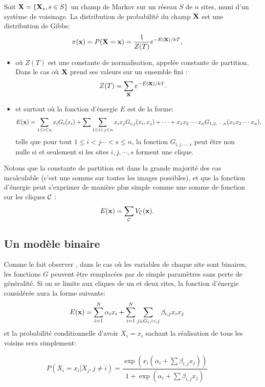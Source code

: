\begin{th}
Soit $\mbox{\bf X}=\{ \mbox{\bf X}_s,s \in S\}$ un champ de Markov sur un r\'eseau $S$ de
$n$ sites, muni
d'un syst\`eme de voisinage. La distribution de probabilit\'e du champ
$\mbox{\bf X}$ est une distribution de Gibbs:
\[
\pi(\mbox{\bf x})=P(\mbox{\bf X}=\mbox{\bf x})=\frac{1}{Z(T)}e^{-E(\mbox{\bf x})/kT},
\]
\begin{itemize}
\item o\`u $Z(T)$ est une constante de normalisation, appel\'ee constante de partition. Dans le
cas o\`u $\mbox{\bf X}$ prend ses valeurs sur un ensemble fini :
$$
Z(T)=\sum_{\mbox{\bf x}} e^{-E(\mbox{\bf x})/kT}.
$$
\item et surtout o\`u la fonction d'\'energie $E$ est de la forme:
\[
E(\mbox{\bf x})=\sum_{1\leq i \leq n} x_i G_i(x_i)+
      \sum \sum_{1\leq i<j\leq n}x_i x_j G_{i,j}(x_i,x_j)+
      \cdots + x_1 x_2 \cdots x_n G_{1,2,\cdots,n}(x_1 x_2 \cdots x_n),
\]
telle que pour tout $1\leq i <j \cdots <s\leq n$, la fonction $G_{i,j,\cdots,s}$
peut \^etre non nulle si et seulement si les sites $i,j,\cdots,s$ forment une clique. 
\end{itemize}
\end{th}
Notons que la constante de partition est dans la grande majorit\'e des cas 
incalculable (c'est une somme sur toutes les images possibles), et 
que la fonction d'\'energie peut s'exprimer de mani\`ere plus simple comme une
somme de fonction sur les cliques ${\cal C}$ :
$$
E(\mbox{\bf x})=\sum_{\cal C} V_{\cal C}(\mbox{\bf x}).
$$

\subsection{Un mod\`ele binaire}

Comme le fait observer , dans le cas o\`u les variables de
chaque site sont binaires, les fonctions $G$ peuvent \^etre remplac\'ees
par de simple param\`etres sans perte de g\'en\'eralit\'e. Si on se limite
aux cliques de un et deux sites, la fonction d'\'energie consid\'er\'ee aura
la forme suivante:
\begin{equation}
E(\mbox{\bf x})=\sum_{i=1}^N \alpha_i x_i + \sum_{i=1}^N \sum_{j \in G_i, i<j} \beta_{i,j} x_i x_j
\end{equation}
et la probabilit\'e conditionnelle d'avoir $X_i=x_i$ sachant la r\'ealisation
de tous les voisins sera simplement:

\begin{equation}
P(X_i=x_i | X_j, j \neq i)=\frac{\exp{(x_i(\alpha_i+\sum \beta_{i,j} x_j))}}
{1+\exp{(\alpha_i+\sum \beta_{i,j} x_j)}}
\end{equation}

